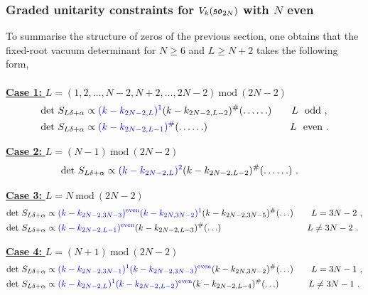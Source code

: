 \subsubsection{Graded unitarity constraints for $V_k(\mathfrak{so}_{2N})$ with $N$ even}
To summarise the structure of zeros of the previous section, one obtains that the fixed-root vacuum determinant for $N \geqslant 6$ and $L \geqslant N+2$ takes the following form, \\
\\
\underline{\textbf{Case 1: } $L = (1,2,\ldots, N-2, N+2, \ldots, 2N-2)~\text{mod}~(2N-2)$}
\begin{equation}
\begin{split}
    &\text{det}~S_{L\delta+\alpha} \propto \textcolor{blue}{(k-k_{2N-2,L})^1}(k-k_{2N-2,L-2})^{\#}( \ldots \ldots) \qquad L \ \ \text{odd}~, \\
    &\text{det}~S_{L\delta+\alpha} \propto \textcolor{blue}{(k-k_{2N-2,L-1})^{\#}}( \ldots \ldots) \qquad \qquad \qquad \qquad \ L \ \ \text{even}~.
\end{split}
\end{equation}

\underline{\textbf{Case 2: } $L = (N-1)~\text{mod}~(2N-2)$}
\begin{equation}
\begin{split}
    &\text{det}~S_{L\delta+\alpha} \propto \textcolor{blue}{(k-k_{2N-2,L})^2}(k-k_{2N-2,L-2})^{\#}( \ldots \ldots)~.
\end{split}
\end{equation}

\underline{\textbf{Case 3: } $L = N~\text{mod}~(2N-2)$}
\begin{equation}
\begin{split}
    &\text{det}~S_{L\delta+\alpha} \propto \textcolor{blue}{(k-k_{2N-2,3N-3})^{\mathrm{even}}(k-k_{2N,3N-2})^1}(k-k_{2N-2, 3N-5})^{\#}( \ldots) \qquad L=3N-2~, \\
    &\text{det}~S_{L\delta+\alpha} \propto \textcolor{blue}{(k-k_{2N-2,L-1})^{\mathrm{even}}}(k - k_{2N-2, L-3})^{\#}( \ldots) \qquad \qquad \qquad \qquad \ \ \ \ \ L \neq 3N-2~.
\end{split}
\end{equation}

\underline{\textbf{Case 4: } $L = (N+1)~\text{mod}~(2N-2)$}
\begin{equation}
\begin{split}
    &\text{det}~S_{L\delta+\alpha} \propto \textcolor{blue}{(k-k_{2N-2,3N-1})^{1}(k-k_{2N-2,3N-3})^{\mathrm{even}}}(k-k_{2N, 3N-2})^{\#}(\ldots) \qquad L=3N-1~, \\
    &\text{det}~S_{L\delta+\alpha} \propto \textcolor{blue}{(k-k_{2N-2,L})^{1} (k - k_{2N-2, L-2})^{\mathrm{even}}}(k - k_{2N-2, L-4})^{\#}(\ldots) \qquad \ \ \ \ L \neq 3N-1~.
\end{split}
\end{equation}

